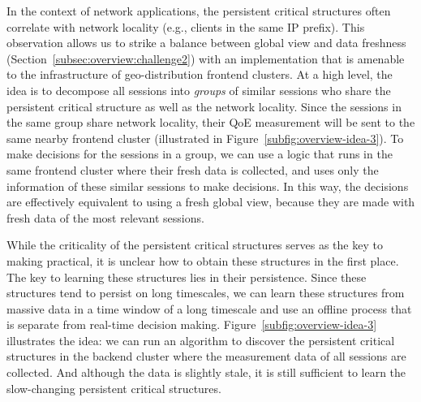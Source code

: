 In the context of network applications, the persistent critical structures often correlate with 
network locality (e.g., clients in the same IP prefix). This observation allows us to strike a 
balance between global view and data freshness (Section~\ref{subsec:overview:challenge2})
with an implementation that is amenable to the infrastructure of geo-distribution frontend 
clusters. At a high level, the idea is to decompose all sessions into {\em groups} of similar 
sessions who share the persistent critical structure as well as the network locality. Since the 
sessions in the same group share network locality, their QoE measurement will be sent to the 
same nearby frontend cluster (illustrated in Figure~\ref{subfig:overview-idea-3}). To make 
decisions for the sessions in a group, we can use a logic that runs in the same frontend cluster 
where their fresh data is collected, and uses only the information of these similar sessions to 
make decisions. In this way, the decisions are effectively equivalent to using a fresh global 
view, because they are made with fresh data of the most relevant sessions.

While the criticality of the persistent critical structures serves as the key to making \ddn practical, 
it is unclear how to obtain these structures in the first place. The key to learning these structures 
lies in their persistence. Since these structures tend to persist on long timescales, we can learn 
these structures from massive data in a time window of a long timescale and use an offline 
process that is separate from real-time decision making. Figure~\ref{subfig:overview-idea-3} 
illustrates the idea: we can run an algorithm to discover the  persistent critical structures in the 
backend cluster where the measurement data of all sessions are collected. And although the 
data is slightly stale, it is still sufficient to learn the slow-changing persistent critical structures.



